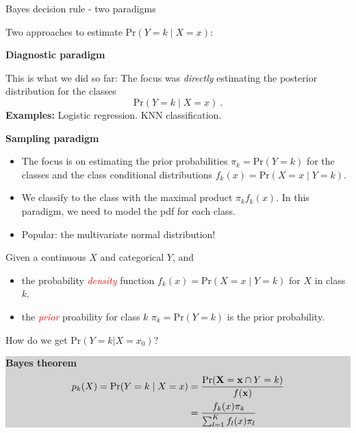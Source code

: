 \documentclass[10pt,ignorenonframetext,]{beamer}
\providecommand{\tightlist}{%
  \setlength{\itemsep}{0pt}\setlength{\parskip}{0pt}}
\begin{document}
\begin{frame}{Bayes decision rule - two paradigms}

\vspace{1mm}

Two approaches to estimate \(\text{Pr}(Y=k \mid X=x)\): \vspace{1mm}

\begin{block}{\textbf{Diagnostic paradigm}}

This is what we did so far: The focus was \emph{directly} estimating the
posterior distribution for the classes \[\text{Pr}(Y=k \mid X=x)\ .\]
\textbf{Examples:} Logistic regression. KNN classification.

\vspace{2mm}

\end{block}

\begin{block}{\textbf{Sampling paradigm}}

\begin{itemize}
\tightlist
\item
  The focus is on estimating the prior probabilities
  \(\pi_k=\text{Pr}(Y=k)\) for the classes and the class conditional
  distributions \(f_k(x)=\text{Pr}(X=x \mid Y=k)\).
\item
  We classify to the class with the maximal product \(\pi_k f_k(x)\). In
  this paradigm, we need to model the pdf for each class.
\item
  Popular: the multivariate normal distribution!
\end{itemize}

\end{block}

\end{frame}

\begin{frame}

Given a continuous \(X\) and categorical \(Y\), and

\begin{itemize}
\tightlist
\item
  the probability \emph{\textcolor{red}{density}} function
  \(f_k(x) = \text{Pr}(X=x \mid Y=k)\) for \(X\) in class \(k\).
\item
  the \emph{\textcolor{red}{prior}} proability for class \(k\)
  \(\pi_k = \text{Pr}(Y=k)\) is the prior probability.
\end{itemize}

How do we get \(\text{Pr}(Y=k | X=x_0)\)?

\begin{center}
\colorbox{lightgray}{\begin{minipage}{10cm}
{\bf Bayes theorem}
\begin{align*}
p_k(X) = \text{Pr}(Y=k \mid X= x) &= 
\frac{\text{Pr}({\bf X}={\bf x} \cap Y=k)}{f({\bf x})}\\
&= \frac{ f_k(x) \pi_k}{\sum_{l=1}^K  f_l(x) \pi_l}  
\end{align*}
\end{minipage}}
\end{center}

\end{frame}
\end{document}
